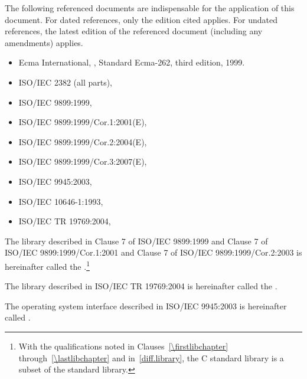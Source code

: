 \pnum
{}%
The following referenced documents are indispensable for the application
of this document. For dated references, only the edition cited applies.
For undated references, the latest edition of the referenced document
(including any amendments) applies.

\begin{itemize}
\item Ecma International, ,
Standard Ecma-262, third edition, 1999.
\item ISO/IEC 2382 (all parts), 
\item ISO/IEC 9899:1999, 
\item ISO/IEC 9899:1999/Cor.1:2001(E), 
\item ISO/IEC 9899:1999/Cor.2:2004(E), 
\item ISO/IEC 9899:1999/Cor.3:2007(E), 
\item ISO/IEC 9945:2003, 
\item ISO/IEC 10646-1:1993, 
\item ISO/IEC TR 19769:2004, 
\end{itemize}

\pnum
The library described in Clause 7 of ISO/IEC 9899:1999 and Clause 7 of
ISO/IEC 9899:1999/Cor.1:2001 and Clause 7 of ISO/IEC
9899:1999/Cor.2:2003 is hereinafter called the
.\footnote{With the qualifications noted in Clauses~\ref{\firstlibchapter}
through~\ref{\lastlibchapter} and in~\ref{diff.library}, the C standard
library is a subset of the \Cpp standard library.}

\pnum
The library described in ISO/IEC TR 19769:2004 is hereinafter called the
.

\pnum
The operating system interface described in ISO/IEC 9945:2003 is
hereinafter called .

